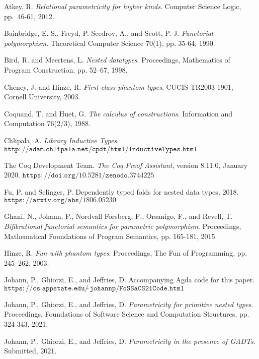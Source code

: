 \documentclass[9pt]{entcs}
\begin{document}
\begin{thebibliography}{10}\label{bibliography}

 Atkey, R.  {\em Relational parametricity for higher
  kinds}.  Computer Science Logic, pp.~46-61, 2012.

 Bainbridge, E. S., Freyd, P. Scedrov, A., and Scott,
  P. J. {\em Functorial polymorphism}. Theoretical Computer Science
  70(1), pp. 35-64, 1990.

 Bird, R. and Meertens, L. {\em Nested
  datatypes}. Proceedings, Mathematics of Program Construction,
  pp. 52–67, 1998.

 Cheney, J. and Hinze, R. {\em First-class phantom
 types}. CUCIS TR2003-1901, Cornell University, 2003.

 Coquand, T. and Huet, G. {\em The calculus of
  constructions}. Information and Computation 76(2/3), 1988.

 Chlipala, A. {\em Library Inductive
  Types}. $\mathtt{http://adam.chlipala.net/cpdt/html/InductiveTypes.html}$

 The Coq Development Team. {\em The Coq Proof
  Assistant}, version 8.11.0, January 2020.
  $\mathtt{https://doi.org/10.5281/zenodo.3744225}$

 Fu, P. and Selinger, P.  Dependently typed folds for
  nested data types, 2018. $\mathtt{https://arxiv.org/abs/1806.05230}$ 
  
 Ghani, N., Johann, P., Nordvall Forsberg, F.,
  Orsanigo, F., and Revell, T. {\em Bifibrational functorial semantics
    for parametric polymorphism}. Proceedings, Mathematical
  Foundations of Program Semantics, pp. 165-181, 2015.

 Hinze, R. {\em Fun with phantom types}. Proceedings,
 The Fun of Programming, pp. 245–262, 2003.

 Johann, P., Ghiorzi, E., and Jeffries,
  D. Accompanying Agda code for this paper.
    $\mathtt{https://cs.appstate.edu/\tilde~johannp/FoSSaCS21Code.html}$
 
 Johann, P., Ghiorzi, E., and Jeffries, D. {\em
  Parametricity for primitive nested types}. Proceedings, Foundations
  of Software Science and Computation Structures, pp. 324-343, 2021.

 Johann, P., Ghiorzi, E., and Jeffries, D. {\em
  Parametricity in the presence of GADTs}. Submitted, 2021.


\end{thebibliography}
\end{document}
